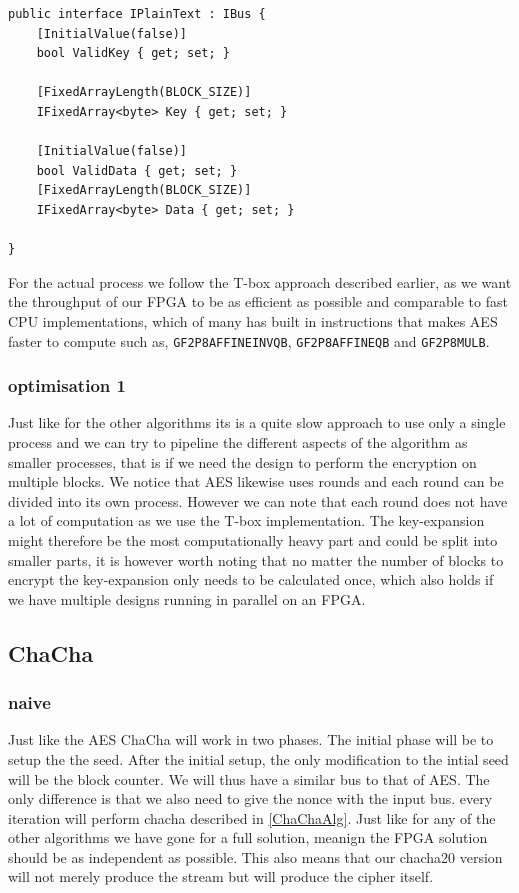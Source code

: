 \documentclass[a4paper]{article}
\begin{document}
\begin{verbatim}
public interface IPlainText : IBus {
    [InitialValue(false)]
    bool ValidKey { get; set; }

    [FixedArrayLength(BLOCK_SIZE)]
    IFixedArray<byte> Key { get; set; }

    [InitialValue(false)]
    bool ValidData { get; set; }
    [FixedArrayLength(BLOCK_SIZE)]
    IFixedArray<byte> Data { get; set; }

}
\end{verbatim}
For the actual process we follow the T-box approach described earlier, as we want the throughput of our FPGA to be as efficient as possible and comparable to fast CPU implementations, which of many has built in instructions that makes AES faster to compute such as, \texttt{GF2P8AFFINEINVQB}, \texttt{GF2P8AFFINEQB} and \texttt{GF2P8MULB}.
\subsubsection{optimisation 1}
\label{sec:org1a97954}
Just like for the other algorithms its is a quite slow approach to use only a single process and we can try to pipeline the different aspects of the algorithm as smaller processes, that is if we need the design to perform the encryption on multiple blocks. We notice that AES likewise uses rounds and each round can be divided into its own process. However we can note that each round does not have a lot of computation as we use the T-box implementation. The key-expansion might therefore be the most computationally heavy part and could be split into smaller parts, it is however worth noting that no matter the number of blocks to encrypt the key-expansion only needs to be calculated once, which also holds if we have multiple designs running in parallel on an FPGA.
\subsection{ChaCha}
\label{sec:org3908ad1}

\subsubsection{naive}
\label{sec:orgab94e15}
Just like the AES ChaCha will work in two phases. The initial phase will be to setup the the seed. After the initial setup, the only modification to the intial seed will be the block counter. We will thus have a similar bus to that of AES. The only difference is that we also need to give the nonce with the input bus. every iteration will perform chacha described in \ref{ChaChaAlg}. Just like for any of the other algorithms we have gone for a full solution, meanign the FPGA solution should be as independent as possible. This also means that our chacha20 version will not merely produce the stream but will produce the cipher itself.
\end{document}

